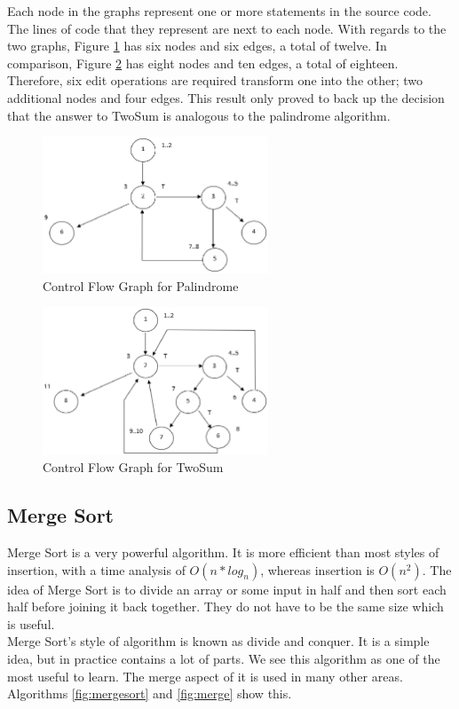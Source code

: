 \documentclass[conference]{IEEEtran}
\begin{document}
 \par Each node in the graphs represent one or more statements in the source code. The lines of code that they represent are next to each node. With regards to the two graphs, Figure \ref{fig:cfgpal} has six nodes and six edges, a total of twelve. In comparison, Figure \ref{fig:cfgtwosum} has eight nodes and ten edges, a total of eighteen. Therefore, six edit operations are required transform one into the other; two additional nodes and four edges. This result only proved to back up the decision that the answer to TwoSum is analogous to the palindrome algorithm.
 \begin{figure}[h]
\includegraphics[width=0.6\textwidth]{CFGPalindrome}
\caption{Control Flow Graph for Palindrome}
\label{fig:cfgpal}
\end{figure}
 \begin{figure}[h]
\includegraphics[width=0.6\textwidth]{CFGTwoSum}
\caption{Control Flow Graph for TwoSum}
\label{fig:cfgtwosum}
\end{figure}

\subsection{Merge Sort}
Merge Sort is a very powerful algorithm. It is more efficient than most styles of insertion, with a time analysis of $O(n * log_{n})$, whereas insertion is $O(n^2)$. The idea of Merge Sort is to divide an array or some input in half and then sort each half before joining it back together. They do not have to be the same size which is useful.  \\
Merge Sort's style of algorithm is known as divide and conquer. It is a simple idea, but in practice contains a lot of parts. We see this algorithm as one of the most useful to learn. The merge aspect of it is used in many other areas. Algorithms \ref{fig:mergesort} and \ref{fig:merge} show this.
\end{document}
